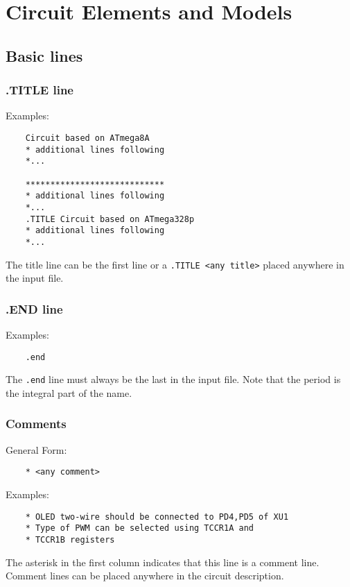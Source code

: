 \chapter{Circuit Elements and Models} \label{chapter:circuit_elements_and_models}

\section{Basic lines}

\subsection{.TITLE line}
\textnormal{Examples:}
\begin{lstlisting}
	Circuit based on ATmega8A
	* additional lines following
	*...

	****************************
	* additional lines following
	*...
	.TITLE Circuit based on ATmega328p
	* additional lines following
	*...
\end{lstlisting}
\textnormal{The title line can be the first line or a
\lstinline|.TITLE <any title>| placed anywhere in the input file.}

\subsection{.END line}
\textnormal{Examples:}
\begin{lstlisting}
	.end
\end{lstlisting}
\textnormal{The \lstinline|.end| line must always be the last in the input
file. Note that the period is the integral part of the name.}

\subsection{Comments}
\textnormal{General Form:}
\begin{lstlisting}
	* <any comment>
\end{lstlisting}
\textnormal{Examples:}
\begin{lstlisting}
	* OLED two-wire should be connected to PD4,PD5 of XU1
	* Type of PWM can be selected using TCCR1A and
	* TCCR1B registers
\end{lstlisting}
\textnormal{The asterisk in the first column indicates that this line is
a comment line. Comment lines can be placed anywhere in the circuit
description.}

